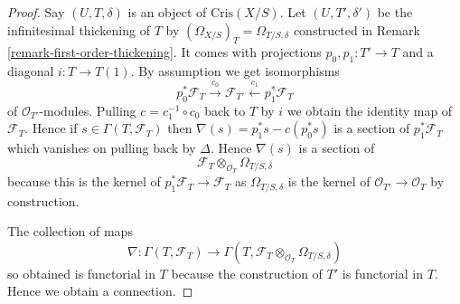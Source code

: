 \begin{proof}
Say $(U, T, \delta)$ is an object of $\text{Cris}(X/S)$.
Let $(U, T', \delta')$ be the infinitesimal thickening of $T$
by $(\Omega_{X/S})_T = \Omega_{T/S, \delta}$
constructed in Remark \ref{remark-first-order-thickening}.
It comes with projections $p_0, p_1 : T' \to T$
and a diagonal $i : T \to T(1)$. By assumption we get
isomorphisms
$$
p_0^*\mathcal{F}_T \xrightarrow{c_0}
\mathcal{F}_{T'} \xleftarrow{c_1}
p_1^*\mathcal{F}_T
$$
of $\mathcal{O}_{T'}$-modules. Pulling $c = c_1^{-1} \circ c_0$
back to $T$ by $i$ we obtain the identity map
of $\mathcal{F}_T$. Hence if $s \in \Gamma(T, \mathcal{F}_T)$
then $\nabla(s) = p_1^*s - c(p_0^*s)$ is a section of
$p_1^*\mathcal{F}_T$ which vanishes on pulling back by $\Delta$. Hence
$\nabla(s)$ is a section of
$$
\mathcal{F}_T
\otimes_{\mathcal{O}_T}
\Omega_{T/S, \delta}
$$
because this is the kernel of $p_1^*\mathcal{F}_T \to \mathcal{F}_T$
as $\Omega_{T/S, \delta}$ is the kernel of
$\mathcal{O}_{T'} \to \mathcal{O}_T$ by construction.

\medskip\noindent
The collection of maps
$$
\nabla : \Gamma(T, \mathcal{F}_T) \to
\Gamma(T, \mathcal{F}_T \otimes_{\mathcal{O}_T} \Omega_{T/S, \delta})
$$
so obtained is functorial in $T$ because the construction of $T'$
is functorial in $T$. Hence we obtain a connection.


\end{proof}
